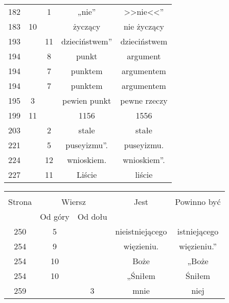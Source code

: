 \documentclass[a4paper,11pt]{article}
\begin{document}
\begin{center}
\begin{tabular}{|c|c|c|c|c|}
    \\
    182 & &  1 & „nie” & >>nie<<”  %
    \\
    183 & 10 & & życzący & nie życzący \\
    193 & & 11 & dzieciństwem” & dzieciństwem \\
    194 & &  8 & punkt & argument \\
    194 & &  7 & punktem & argumentem \\
    194 & &  7 & punktem & argumentem \\
    195 &  3 & & pewien punkt & pewne rzeczy \\
    199 & 11 & & 1156 & 1556 \\
    203 & &  2 & stale & stałe \\
    221 & &  5 & puseyizmu”. & puseyizmu. \\
    224 & & 12 & wnioskiem. & wnioskiem”. \\
    227 & & 11 & Liście & liście \\
    \hline
  \end{tabular}





  \newpage

  \begin{tabular}{|c|c|c|c|c|}
    \hline
    & \multicolumn{2}{c|}{} & & \\
    Strona & \multicolumn{2}{c|}{Wiersz} & Jest
                              & Powinno być \\ \cline{2-3}
    & Od góry & Od dołu & & \\
    \hline
    250 &  5 & & nieistniejącego & istniejącego \\
    254 &  9 & & więzieniu. & więzieniu.'' \\
    254 & 10 & & Boże & „Boże \\
    254 & 10 & & „Śniłem & Śniłem \\
    259 & &  3 & mnie & niej \\
    \hline
  \end{tabular}

\end{center}
\end{document}
